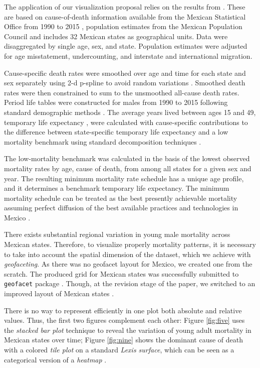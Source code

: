 \documentclass[10pt, twoside, parskip=half]{article}
\begin{document}
The application of our visualization proposal relies on the results from \citet{aburto2018bo}. These are based on cause-of-death information available from the Mexican Statistical Office from 1990 to 2015 \citep{INEGI}, population estimates from the Mexican Population Council and includes 32 Mexican states as geographical units. Data were disaggregated by single age, sex, and state. Population estimates were adjusted for age misstatement, undercounting, and interstate and international migration.

Cause-specific death rates were smoothed over age and time for each state and sex separately using 2-d p-spline to avoid random variations \citep{camarda2012jss}. Smoothed death rates were then constrained to sum to the unsmoothed all-cause death rates. Period life tables were constructed for males from 1990 to 2015 following standard demographic methods \citep[Chapter 3]{preston2001}. The average years lived between ages 15 and 49, temporary life expectancy \citep{arriaga1984d}, were calculated with cause-specific contributions to the difference between state-specific temporary life expectancy and a low mortality benchmark using standard decomposition techniques \citep{horiuchi2008d}.

The low-mortality benchmark was calculated in the basis of the lowest observed mortality rates by age, cause of death, from among all states for a given sex and year. The resulting minimum mortality rate schedule has a unique age profile, and it determines a benchmark temporary life expectancy. The minimum mortality schedule can be treated as the best presently achievable mortality assuming perfect diffusion of the best available practices and technologies in Mexico \citep{vallin2008p, canudas-romo2019naaj}.

There exists substantial regional variation in young male mortality across Mexican states. Therefore, to visualize properly mortality patterns, it is necessary to take into account the spatial dimension of the dataset, which we achieve with \emph{geofaceting}. As there was no geofacet layout for Mexico, we created one from the scratch. The produced grid for Mexican states was successfully submitted to \texttt{geofacet} package \citep{kashnitsky2017ga}. Though, at the revision stage of the paper, we switched to an improved layout of Mexican states \citep{zepeda2018g}.

There is no way to represent efficiently in one plot both absolute and relative values. Thus, the first two figures complement each other: Figure \ref{fig:five} uses the \emph{stacked bar plot} technique to reveal the variation of young adult mortality in Mexican states over time; Figure \ref{fig:nine} shows the dominant cause of death with a colored \emph{tile plot} on a standard \emph{Lexis surface}, which can be seen as a categorical version of a \emph{heatmap} \citep{scholey2017dr, rau2018}.
\end{document}
